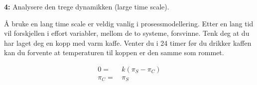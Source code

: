 \begin{center}
    \textbf{4:} Analysere den trege dynamikken (large time scale).
\end{center}

Å bruke en lang time scale er veldig vanlig i prosessmodellering. Etter en lang tid vil forskjellen i effort variabler, mellom de to systeme, forsvinne. Tenk deg at du har laget deg en kopp med varm kaffe. Venter du i 24 timer før du drikker kaffen kan du forvente at temperaturen til koppen er den samme som rommet. 

\begin{align}
    0 =&\, k(\pi_S - \pi_C) \\
    \pi_C =&\, \pi_S
\end{align}